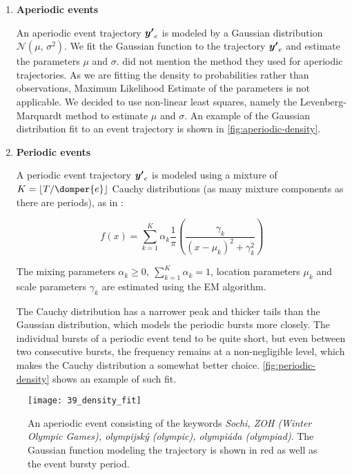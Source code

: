 \begin{enumerate}

\item \textbf{Aperiodic events}

An aperiodic event trajectory $\vect{\trajn}_{e}$ is modeled by a Gaussian distribution $\mathcal{N}(\mu,\,\sigma^{2})$. We fit the Gaussian function to the trajectory $\vect{\trajn}_{e}$ and estimate the parameters $\mu$ and $\sigma$. \cite{event-detection} did not mention the method they used for aperiodic trajectories. As we are fitting the density to probabilities rather than observations, Maximum Likelihood Estimate of the parameters is not applicable. We decided to use non-linear least squares, namely the Levenberg-Marquardt method \citep{least-squares} to estimate $\mu$ and $\sigma$. An example of the Gaussian distribution fit to an event trajectory is shown in \autoref{fig:aperiodic-density}.

\item \textbf{Periodic events}

A periodic event trajectory $\vect{\trajn}_{e}$ is modeled using a mixture of $K = \floor{\streamlen / \domper{e}}$ Cauchy distributions (as many mixture components as there are periods), as in \cite{health-events}:

\begin{equation*}
	f(x) = \sum_{k = 1}^{K}{\alpha_{k} \frac{1}{\pi} \left( \frac{\gamma_{k}}{\left( x - \mu_{k} \right)^{2} + \gamma_{k}^{2}} \right)}
\end{equation*}

The mixing parameters $\alpha_{k} \geq 0,\ \sum_{k = 1}^{K}{\alpha_{k}} = 1$, location parameters $\mu_{k}$ and scale parameters $\gamma_{k}$ are estimated using the EM algorithm.

The Cauchy distribution has a narrower peak and thicker tails than the Gaussian distribution, which models the periodic bursts more closely. The individual bursts of a periodic event tend to be quite short, but even between two consecutive bursts, the frequency remains at a non-negligible level, which makes the Cauchy distribution a somewhat better choice. \autoref{fig:periodic-density} shows an example of such fit.

\end{enumerate}

\begin{figure}
  \centering
  \texttt{[image: 39\_density\_fit]}  %
  \caption{An aperiodic event consisting of the keywords \textit{Sochi, ZOH (Winter Olympic Games), olympijský (olympic), olympiáda (olympiad)}. The Gaussian function modeling the trajectory is shown in red as well as the event bursty period.}
  \label{fig:aperiodic-density}
\end{figure}


